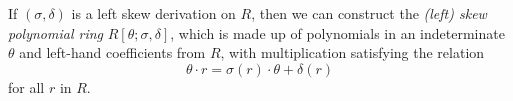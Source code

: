 \documentclass{article}
\begin{document}
If $(\sigma, \delta)$ is a left skew derivation on $R$,
then we can construct the
{\it (left) skew polynomial ring}
$R[\theta;\sigma,\delta]$, which is made up of
polynomials in an indeterminate $\theta$
and left-hand coefficients from $R$,
with multiplication satisfying the relation
$$\theta \cdot r = \sigma(r) \cdot \theta + \delta(r)$$
for all $r$ in $R$.
\end{document}
